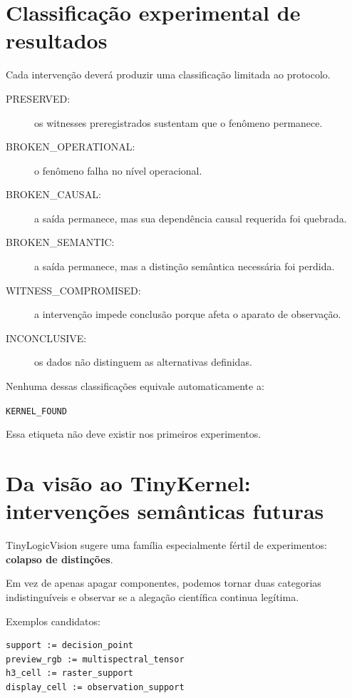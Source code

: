 \documentclass[11pt,a4paper]{article}
\begin{document}
\section{Classificação experimental de resultados}

Cada intervenção deverá produzir uma classificação limitada ao protocolo.

\begin{description}
  \item[PRESERVED:] os witnesses preregistrados sustentam que o fenômeno permanece.
  \item[BROKEN\_OPERATIONAL:] o fenômeno falha no nível operacional.
  \item[BROKEN\_CAUSAL:] a saída permanece, mas sua dependência causal requerida foi
  quebrada.
  \item[BROKEN\_SEMANTIC:] a saída permanece, mas a distinção semântica necessária
  foi perdida.
  \item[WITNESS\_COMPROMISED:] a intervenção impede conclusão porque afeta o aparato
  de observação.
  \item[INCONCLUSIVE:] os dados não distinguem as alternativas definidas.
\end{description}

Nenhuma dessas classificações equivale automaticamente a:

\begin{center}
\texttt{KERNEL\_FOUND}
\end{center}

Essa etiqueta não deve existir nos primeiros experimentos.

\section{Da visão ao TinyKernel: intervenções semânticas futuras}

TinyLogicVision sugere uma família especialmente fértil de experimentos:
\textbf{colapso de distinções}.

Em vez de apenas apagar componentes, podemos tornar duas categorias
indistinguíveis e observar se a alegação científica continua legítima.

Exemplos candidatos:

\begin{lstlisting}
support := decision_point
preview_rgb := multispectral_tensor
h3_cell := raster_support
display_cell := observation_support
\end{lstlisting}
\end{document}
